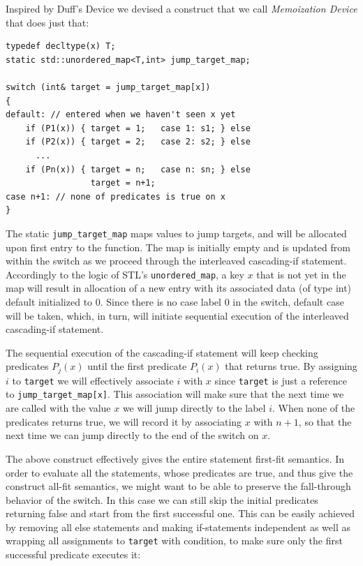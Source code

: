 \documentclass[preprint]{sigplanconf}
\makeatletter
\DeclareRobustCommand{\code}[1]{{\lstinline[breaklines=false,escapechar=@]{#1}}}
\makeatother
\begin{document}
Inspired by Duff's Device\cite{Duff} we devised a construct that we call 
\emph{Memoization Device} that does just that:

\begin{lstlisting}
typedef decltype(x) T;
static std::unordered_map<T,int> jump_target_map;

switch (int& target = jump_target_map[x])
{
default: // entered when we haven't seen x yet
    if (P1(x)) { target = 1;   case 1: s1; } else 
    if (P2(x)) { target = 2;   case 2: s2; } else
      ...
    if (Pn(x)) { target = n;   case n: sn; } else
                 target = n+1;
case n+1: // none of predicates is true on x
}
\end{lstlisting}

\noindent
The static \code{jump_target_map} maps values to jump targets, and will be 
allocated upon first entry to the function. The map is initially empty and is 
updated from within the switch as we proceed through the interleaved 
cascading-if statement. Accordingly to the logic of STL's \code{unordered_map}, 
a key $x$ that is not yet in the map will result in allocation of a new entry 
with its associated data (of type int) default initialized to 0. Since there is 
no case label 0 in the switch, default case will be taken, which, in turn, will 
initiate sequential execution of the interleaved cascading-if statement.

The sequential execution of the cascading-if statement will keep checking 
predicates $P_j(x)$ until the first predicate $P_i(x)$ that returns true. By 
assigning $i$ to \code{target} we will effectively associate $i$ with $x$ since 
\code{target} is just a reference to \code{jump_target_map[x]}. This association 
will make sure that the next time we are called with the value $x$ we will jump 
directly to the label $i$. When none of the predicates returns true, we will 
record it by associating $x$ with $n+1$, so that the next time we can jump 
directly to the end of the switch on $x$. 

The above construct effectively gives the entire statement first-fit semantics. 
In order to evaluate all the statements, whose predicates are true, and thus 
give the construct all-fit semantics, we might want to be able to preserve the 
fall-through behavior of the switch. In this case we can still skip the initial 
predicates returning false and start from the first successful one. This can be 
easily achieved by removing all else statements and making if-statements 
independent as well as wrapping all assignments to \code{target} with condition, 
to make sure only the first successful predicate executes it:
\end{document}
